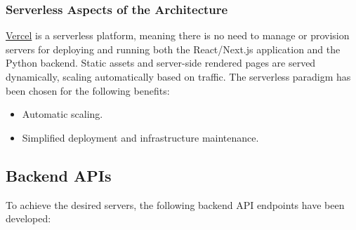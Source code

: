 \subsubsection{Serverless Aspects of the Architecture}
\href{https://vercel.com/}{Vercel} is a serverless platform, meaning there is no need to manage or provision servers for deploying and running both the React/Next.js application and the Python backend. Static assets and server-side rendered pages are served dynamically, scaling automatically based on traffic.
The serverless paradigm has been chosen for the following benefits:
\begin{itemize}
\item Automatic scaling.
\item Simplified deployment and infrastructure maintenance.
\end{itemize}

\subsection{Backend APIs}
To achieve the desired servers, the following backend API endpoints have been developed:

